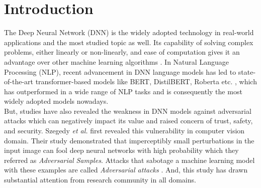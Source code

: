\documentclass[%
	BCOR=8mm, %
	DIV=12,
	toc=bibliography, %
	toc=listof, %
	oneside, %
	egregdoesnotlikesansseriftitles, %
	]{scrbook}
\begin{document}








\tableofcontents
\listoffigures
\listoftables

% 
\newpage


\pagestyle{headings}
\setcapindent{0pt}



\chapter{Introduction}
The Deep Neural Network (DNN) is the widely  adopted technology in real-world applications and the most studied topic as well. Its capability of solving complex problems, either linearly or non-linearly, and ease of computation gives it an advantage over other machine learning algorithms \cite{huq_adversarial_2020}. In Natural Language Processing (NLP), recent advancement in DNN  language models  has led to state-of-the-art transformer-based models like BERT,  DistilBERT, Roberta etc. \cite{devlin_bert_2019-1,liu_roberta_2019-1,sanh_distilbert_2020,lan_albert_2020}, which has outperformed in a wide range of NLP tasks  and is consequently the most widely adopted models nowadays.\\
But, studies have also revealed the weakness in DNN models against adversarial attacks \cite{szegedy_intriguing_2014,yuan_adversarial_2018,akhtar_threat_2018,huq_adversarial_2020,zhang_adversarial_2019} which can negatively impact its value and raised concern of trust, safety, and security. Szegedy \textit{et al.} \cite{szegedy_intriguing_2014} first revealed this vulnerability in computer vision domain. Their study demonstrated that imperceptibly small perturbations in the input image can fool deep neural networks with high probability which they referred  as \textit{Adversarial Samples}. Attacks that sabotage a machine learning model with these examples are called \textit{Adversarial attacks} \cite{nicolae_adversarial_2019}. And, this study has drawn substantial attention from research community in all domains. \\
\end{document}
